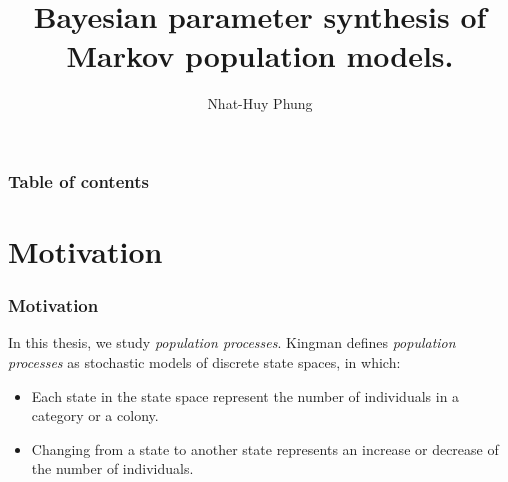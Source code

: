 \documentclass{beamer}
\begin{document}
\title{Bayesian parameter synthesis of Markov population models.}
\author{Nhat-Huy Phung}

\begin{frame}
  \titlepage
\end{frame}

\begin{frame}
  \frametitle{Table of contents}
  \tableofcontents
\end{frame}

\section{Motivation}
\begin{frame}
  \frametitle{Motivation}
  In this thesis, we study \textit{population processes}. Kingman
  \cite{10.2307/3212273} defines \textit{population
    processes} as stochastic models of discrete state spaces, in which:
  \begin{itemize}
    \item Each state in the state space represent the number of individuals in a
          category or a colony.
    \item Changing from a state to another state represents an increase or
          decrease of the number of individuals.
  \end{itemize}
\end{frame}
\end{document}
